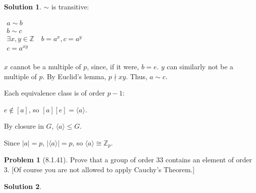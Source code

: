 \documentclass[12pt]{article}
\theoremstyle{definition}
\newtheorem*{prob}{Problem}
\newtheorem*{soln}{Solution}
\newcommand{\ZZ}{{\mathbb{Z}}}
\begin{document}
\begin{soln}
$\sim$ is transitive:

$\begin{gathered}
a\sim b\\
b\sim c\\
\exists x,y\in \ZZ \quad b=a^x,c=a^y\\
c=a^{xy}\\
\end{gathered}$

$x$ cannot be a multiple of $p$, since, if it were, $b=e$.
$y$ can similarly not be a multiple of $p$.
By Euclid's lemma, $p\nmid xy$.
Thus, $a\sim c$.

Each equivalence class is of order $p-1$:

$e\not\in [a]$, so $[a][e]=\langle a\rangle$.

By closure in $G$, $\langle a\rangle\leq G$.

Since $|a|=p$, $|\langle a\rangle|=p$, so $\langle a\rangle\cong \ZZ_p$.

\end{soln}


\begin{prob}[8.1.41]
Prove that a group of  order $33$ contains an element of order $3$.
[Of course you are not allowed to apply Cauchy's Theorem.]
\end{prob}

\begin{soln}

\end{soln}
\end{document}
